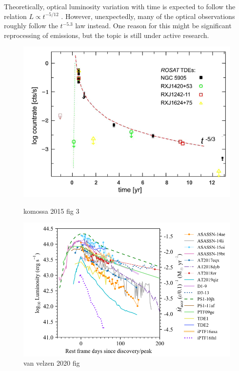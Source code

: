 \documentclass{tda}
\begin{document}
Theoretically, optical luminosity variation with time is expected to follow the relation \(L \propto t^{-5/12}\) \cite{lodato_multiband_2011}. However, unexpectedly, many of the optical observations roughly follow the \(t^{-5.3}\) law instead. One reason for this might be significant reprocessing of emissions, but the topic is still under active research.

\begin{figure} 
	\begin{minipage} {.5 \textwidth}
		\includegraphics[width=0.9\linewidth]{./images/komossa2015.png}
		\caption{komossa 2015 fig 3}
		\label{fig:xray_luminosity}
	\end{minipage}%
	\begin{minipage} {.5 \textwidth}
		\includegraphics[width=\linewidth]{./images/vanvelzen2020.png}
		\caption{van velzen 2020 fig}
		\label{fig:optical UV_luminosity}
	\end{minipage}
\end{figure}
\end{document}
